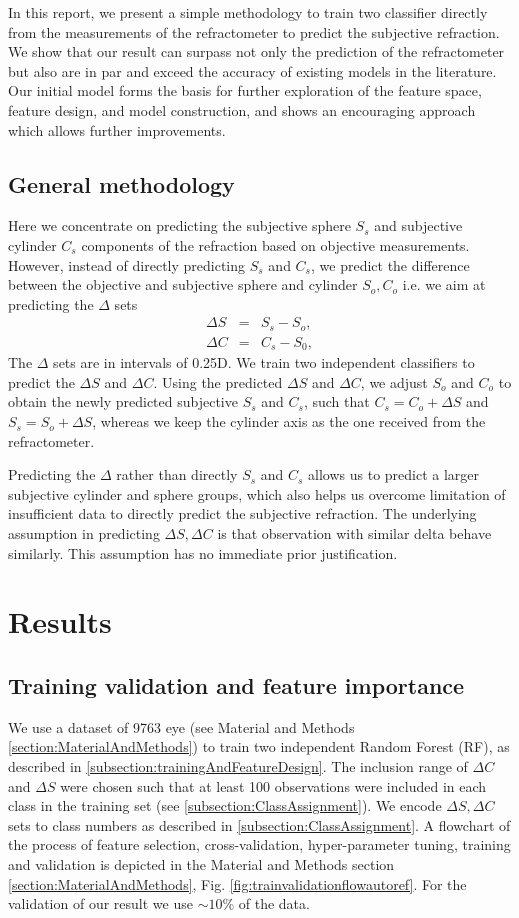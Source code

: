 \documentclass[article,twocolumn,preprint,10pt]{paper}%
\renewcommand{\(}{\left(}
\renewcommand{\)}{\right)}
\renewcommand{\[}{\left[}
\renewcommand{\]}{\right]}
\newcommand{\beq}{\begin{eqnarray}}
\newcommand{\eeq}{\end{eqnarray}}
\newcommand{\1}{\mbox{\boldmath$1$}}
\begin{document}
    In this report, we present a simple methodology to train two classifier directly from the measurements of the refractometer to predict the subjective refraction. We show that our result can surpass not only the prediction of the refractometer but also are in par and exceed the accuracy of existing models in the literature. Our initial model forms the basis for further exploration of the feature space, feature design, and model construction, and shows an encouraging approach which allows further improvements.
	\subsection{General methodology}\label{subsection:GeneralMethodology}
	Here we concentrate on predicting the subjective sphere $S_s$ and subjective cylinder $C_s$ components of the refraction based on objective measurements. However, instead of directly predicting $S_s$ and $C_s$, we predict the difference between the objective and subjective sphere and cylinder  $S_o, C_o$ i.e. we aim at predicting the $\Delta$ sets
	\beq 
	\Delta S &=& S_s-S_o,\\
	\Delta C &=& C_s-S_0,
	\eeq
	The $\Delta$ sets are in intervals of 0.25D. 
	We train two independent classifiers to predict the $\Delta S$ and $\Delta C$. Using the predicted $\Delta S$ and $\Delta C$, we  adjust $S_o$ and $C_o$ to obtain the newly predicted subjective $S_s$ and $C_s$, such that $C_s = C_o+\Delta S$ and $S_s=S_o+\Delta S$, whereas we keep the cylinder axis as the one received from the refractometer. 
		
	Predicting the $\Delta$ rather than directly $S_s$ and $C_s$ allows us to predict a larger subjective cylinder and sphere groups, which also helps us overcome limitation of insufficient data to directly predict the subjective refraction.
	The underlying assumption in predicting $\Delta S,\Delta C$ is that observation with similar delta behave similarly. This assumption has no immediate prior justification. 
	
	\section{Results}
	\subsection{Training validation and feature importance}
	We use a dataset of 9763 eye (see Material and Methods \ref{section:MaterialAndMethods}) to train two independent Random Forest (RF), as described in \ref{subsection:trainingAndFeatureDesign}. The inclusion range of $\Delta C$ and $\Delta S$ were chosen such that at least 100 observations were included in each class in the training set (see \ref{subsection:ClassAssignment}). We encode $\Delta S, \Delta C$ sets to class numbers as described in \ref{subsection:ClassAssignment}. A flowchart of the process of feature selection, cross-validation, hyper-parameter tuning, training and validation is depicted in the Material and Methods section \ref{section:MaterialAndMethods}, Fig. \ref{fig:trainvalidationflowautoref}. For the validation of our result we use $\sim 10 \%$ of the data. 
	
\end{document}
